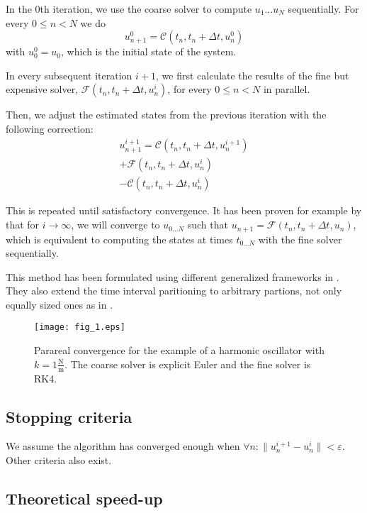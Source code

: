 \documentclass[conference]{IEEEtran}
\begin{document}
In the 0th iteration, we use the coarse solver to compute $u_1\dots u_N$ sequentially. For every $0 \leq n < N$ we do
$$
u^0_{n+1} = \mathcal{C}(t_n, t_n+\Delta t, u^0_n)
$$
with $u^0_0 = u_0$, which is the initial state of the system.

In every subsequent iteration $i+1$, we first calculate the results of the fine but expensive solver, $\mathcal{F}(t_n, t_n+\Delta t, u^{i}_n)$, for every $0 \leq n < N$ in parallel.

Then, we adjust the estimated states from the previous iteration with the following correction:
\begin{multline}
u^{i+1}_{n+1} = \mathcal{C}(t_n, t_n+\Delta t, u^{i+1}_n)\\ + \mathcal{F}(t_n, t_n+\Delta t, u^i_n)\\ - \mathcal{C}(t_n, t_n+\Delta t, u^{i}_n)
\end{multline}

This is repeated until satisfactory convergence. It has been proven for example by \cite{parareal2} that for $i \to \infty$, we will converge to $u_{0\dots N}$ such that $u_{n+1} = \mathcal{F}(t_n, t_n+\Delta t, u_n)$, which is equivalent to computing the states at times $t_{0\dots N}$ with the fine solver sequentially.

This method has been formulated using different generalized frameworks in \cite{parareal2}. They also extend the time interval paritioning to arbitrary partions, not only equally sized ones as in \cite{parareal}.

\begin{figure}[htbp]
\centerline{\texttt{[image: fig\_1.eps]}}
\caption{Parareal convergence for the example of a harmonic oscillator with $k = 1\frac{\text{N}}{\text{m}}$. The coarse solver is explicit Euler and the fine solver is RK4.}
\label{oscillator}
\end{figure}

\subsection*{Stopping criteria}
We assume the algorithm has converged enough when $\forall n\colon \|u^{i+1}_n - u^i_n\| < \varepsilon$. Other criteria also exist. \cite{speedup}

\subsection*{Theoretical speed-up}
\end{document}
